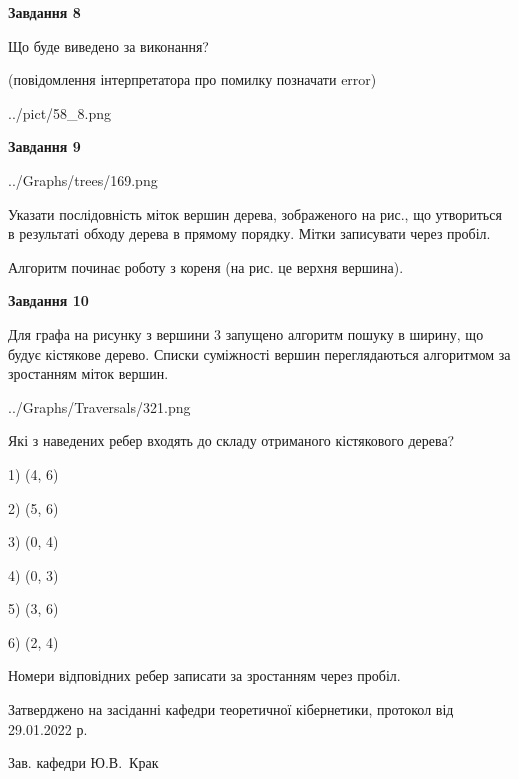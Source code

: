 \documentclass[12pt, ukrainian]{article}
\begin{document}
{\begin {large}
{\begin {center}\textbf{Завдання 8}\end {center}}\par
Що буде виведено за виконання?\par
 (повідомлення інтерпретатора про помилку позначати error)\par
\begin{center}
	{../pict/58_8.png}
\end{center}
\newpage

{\begin {center}\textbf{Завдання 9}\end {center}}\par

\begin{center}
	{../Graphs/trees/169.png}
\end{center}
Указати послідовність міток вершин дерева, зображеного на рис., що утвориться в результаті обходу дерева в прямому порядку. Мітки записувати через пробіл.\par Алгоритм починає роботу з кореня (на рис. це верхня вершина).\par
\newpage

{\begin {center}\textbf{Завдання 10}\end {center}}\par
Для графа на рисунку з вершини 3 запущено алгоритм пошуку в ширину, що будує кістякове дерево. Списки суміжності вершин переглядаються алгоритмом за зростанням міток вершин.\par
\begin{center}
	{../Graphs/Traversals/321.png}
\end{center}
\par Які з наведених ребер входять до складу отриманого кістякового дерева?\par
1) (4, 6)\par
2) (5, 6)\par
3) (0, 4)\par
4) (0, 3)\par
5) (3, 6)\par
6) (2, 4)\par
{\vskip 15pt} Номери відповідних ребер записати за зростанням через пробіл.\par
\newpage


\end {large}
}
{\smallskip \begin {small} Затверджено на засіданні кафедри теоретичної кібернетики, протокол  від   29.01.2022 р.\par\smallskip\smallskip
{\parbox {6.5 cm}{Зав. кафедри \dotfill Ю.В.~Крак}} \end{small}}
\end{document}
